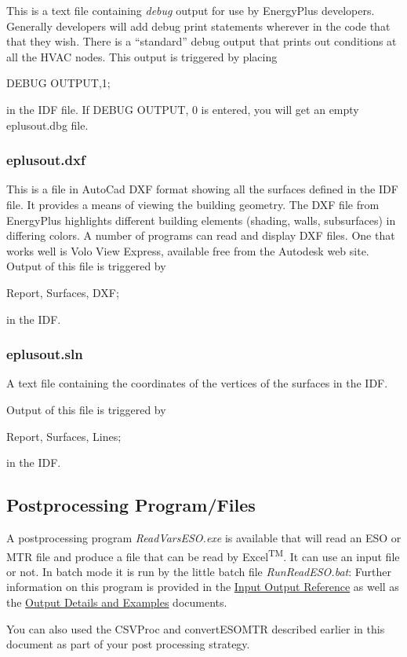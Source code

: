 This is a text file containing \emph{debug} output for use by EnergyPlus developers. Generally developers will add debug print statements wherever in the code that that they wish. There is a ``standard'' debug output that prints out conditions at all the HVAC nodes. This output is triggered by placing

DEBUG OUTPUT,1;

in the IDF file. If DEBUG OUTPUT, 0 is entered, you will get an empty eplusout.dbg file.

\subsubsection{eplusout.dxf}\label{eplusout.dxf}

This is a file in AutoCad DXF format showing all the surfaces defined in the IDF file. It provides a means of viewing the building geometry. The DXF file from EnergyPlus highlights different building elements (shading, walls, subsurfaces) in differing colors. A number of programs can read and display DXF files. One that works well is Volo View Express, available free from the Autodesk web site. Output of this file is triggered by

Report, Surfaces, DXF;

in the IDF.

\subsubsection{eplusout.sln}\label{eplusout.sln}

A text file containing the coordinates of the vertices of the surfaces in the IDF.

Output of this file is triggered by

Report, Surfaces, Lines;

in the IDF.

\subsection{Postprocessing Program/Files}\label{postprocessing-programfiles-000}

A postprocessing program \emph{ReadVarsESO.exe} is available that will read an ESO or MTR file and produce a file that can be read by Excel\textsuperscript{TM}. It can use an input file or not. In batch mode it is run by the little batch file \emph{RunReadESO.bat}: Further information on this program is provided in the \href{file:///E:/Docs4PDFs/InputOutputReference.pdf}{Input Output Reference} as well as the \href{file:///E:/Docs4PDFs/OutputDetailsAndExamples.pdf}{Output Details and Examples} documents.

You can also used the CSVProc and convertESOMTR described earlier in this document as part of your post processing strategy.
